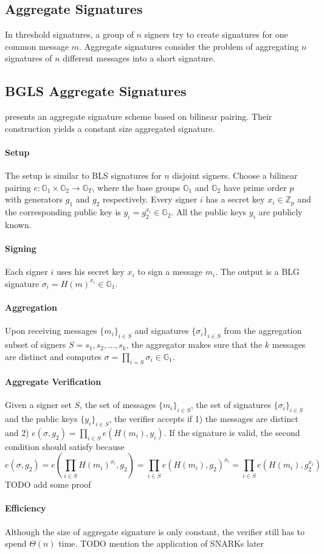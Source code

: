 \subsection{Aggregate Signatures} \label{subsec:aggregate}
In threshold signatures, a group of $n$ signers try to create signatures for one common message $m$. Aggregate signatures consider the problem of aggregating $n$ signatures of $n$ different messages into a short signature. 

\subsection{BGLS Aggregate Signatures} \cite{DBLP:conf/eurocrypt/BonehGLS03} presents an aggregate signature scheme based on bilinear pairing. Their construction yields a constant size aggregated signature. 

\paragraph{Setup} The setup is similar to BLS signatures for $n$ disjoint signers. Choose a bilinear pairing $e:\mathbb{G}_1\times \mathbb{G}_2\to \mathbb{G}_T$, where the base groups $\mathbb{G}_1$ and $\mathbb{G}_2$ have prime order $p$ with generators $g_1$ and $g_2$ respectively. Every signer $i$ has a secret key $x_i\in \mathbb{Z}_p$ and the corresponding public key is $y_i = g_2^{x_i}\in \mathbb{G}_2$. All the public keys $y_i$ are publicly known. 

\paragraph{Signing} Each signer $i$ uses his secret key $x_i$ to sign a message $m_i$. The output is a BLG signature $\sigma_i = H(m)^{x_i}\in \mathbb{G}_1$.  

\paragraph{Aggregation} Upon receiving messages $\{m_i\}_{i\in S}$ and signatures $\{\sigma_i\}_{i\in S}$ from the aggregation subset of signers $S={s_1, s_2,\dots, s_k}$, the aggregator makes sure that the $k$ messages are distinct and computes $\sigma=\prod_{i=S} \sigma_i \in \mathbb{G}_1$. 

\paragraph{Aggregate Verification} Given a signer set $S$, the set of messages $\{m_i\}_{i\in S}$, the set of signatures $\{\sigma_i\}_{i\in S}$ and the public keys $\{y_i\}_{i\in S}$, the verifier accepts if 1) the messages are distinct and 2) $e(\sigma, g_2)=\prod_{i\in S}e(H(m_i), y_i)$. If the signature is valid, the second condition should satisfy because 
\begin{equation*}
    e(\sigma, g_2) = e(\prod_{i\in S}H(m_i)^{x_i}, g_2) = \prod_{i\in S} e(H(m_i), g_2)^{x_i} = \prod_{i\in S}e(H(m_i), g_2^{x_i}) %
\end{equation*}
{\color{red} TODO add some proof}

\paragraph{Efficiency} Although the size of aggregate signature is only constant, the verifier still has to spend $\Theta(n)$ time. {\color{red} TODO mention the application of SNARKs later}


